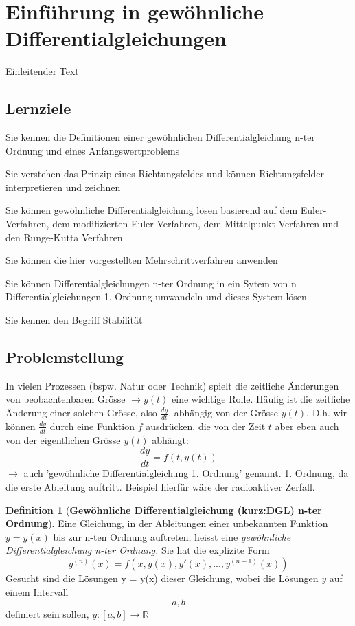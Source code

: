 \documentclass{article}
\theoremstyle{satz}
\theoremstyle{definition}
\newtheorem{definition}{Definition}
\begin{document}
\section{Einführung in gewöhnliche Differentialgleichungen}
Einleitender Text

\subsection{Lernziele}

\begin{description}
	\item{Sie kennen die Definitionen einer gewöhnlichen Differentialgleichung n-ter Ordnung und eines Anfangswertproblems}
	\item{Sie verstehen das Prinzip eines Richtungsfeldes und können Richtungsfelder interpretieren und zeichnen}
	\item{Sie können gewöhnliche Differentialgleichung lösen basierend auf dem Euler-Verfahren, dem modifizierten Euler-Verfahren, dem Mittelpunkt-Verfahren und den Runge-Kutta Verfahren}
	\item{Sie können die hier vorgestellten Mehrschrittverfahren anwenden}
	\item{Sie können Differentialgleichungen n-ter Ordnung in ein Sytem von n Differentialgleichungen 1. Ordnung umwandeln und dieses System lösen}
	\item{Sie kennen den Begriff Stabilität}
\end{description}
	
\subsection{Problemstellung}
In vielen Prozessen (bspw. Natur oder Technik) spielt die zeitliche Änderungen von beobachtenbaren Grösse $\rightarrow y(t)$ eine wichtige Rolle. Häufig ist die zeitliche Änderung einer solchen Grösse, also $\frac{dy}{dt}$, abhängig von der Grösse $y(t)$. D.h. wir können $\frac{dy}{dt}$ durch eine Funktion $f$ ausdrücken, die von der Zeit $t$ aber eben auch von der eigentlichen Grösse $y(t)$ abhängt:
\begin{equation}
\frac{dy}{dt} = f(t,y(t))
\end{equation}
$\rightarrow$ auch 'gewöhnliche Differentialgleichung 1. Ordnung' genannt. 1. Ordnung, da die erste Ableitung auftritt.
Beispiel hierfür wäre der radioaktiver Zerfall.

\begin{tcolorbox}
\begin{definition}[\textbf{Gewöhnliche Differentialgleichung (kurz:DGL) n-ter Ordnung}]
Eine Gleichung, in der Ableitungen einer unbekannten Funktion $y = y(x)$ bis zur n-ten Ordnung auftreten, heisst eine \textit{gewöhnliche Differentialgleichung n-ter Ordnung.} Sie hat die explizite Form
\begin{equation}
y^{(n)}(x)=f(x,y(x),y'(x), ...,y^{(n-1)}(x))
\end{equation}
Gesucht sind die Lösungen y = y(x) dieser Gleichung, wobei die Lösungen $y$ auf einem Intervall \[a, b\] definiert sein sollen, $y: [a,b] \rightarrow \mathbb{R}$
\end{definition}
\end{tcolorbox}
\end{document}

